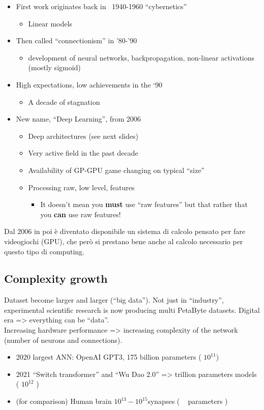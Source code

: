\quad
\begin{itemize}
	\item First work originates back in ~1940-1960 “cybernetics” 
	\begin{itemize}
		\item Linear models
	\end{itemize}
	\item Then called “connectionism” in ’80-’90
	\begin{itemize}
		\item development of neural networks, backpropagation, non-linear activations (mostly sigmoid)
	\end{itemize}
	\item High expectations, low achievements in the ‘90
	\begin{itemize}
		\item A decade of stagnation
	\end{itemize}
	\item New name, “Deep Learning”, from 2006
	\begin{itemize}
		\item Deep architectures (see next slides)
		\item Very active field in the past decade
		\item Availability of GP-GPU game changing on typical “size”
		\item Processing raw, low level, features
		\begin{itemize}
			\item It doesn’t mean you \textbf{must} use “raw features” but that rather that you \textbf{can} use raw features!
		\end{itemize}
	\end{itemize}
\end{itemize}

Dal 2006 in poi è diventato disponibile un sistema di calcolo pensato per fare videogiochi (GPU), che però si prestano bene anche al calcolo necessario per questo tipo di computing.


\subsection{Complexity growth}
Dataset become larger and larger (“big data”). Not just in “industry”, experimental scientific research is now producing multi PetaByte datasets. Digital era => everything can be “data”.\\

Increasing hardware performance => increasing complexity of the network (number of neurons and connections).\\
\begin{itemize}
	\item 2020 largest ANN: OpenAI GPT3, 175 billion parameters ( $10^{11}$)
	\item 2021 “Switch transformer” and “Wu Dao 2.0” => trillion parameters models ( $10^{12}$ )
	\item (for comparison) Human brain $10^{13} - 10^{15} $synapses ( ~ parameters )
\end{itemize}

